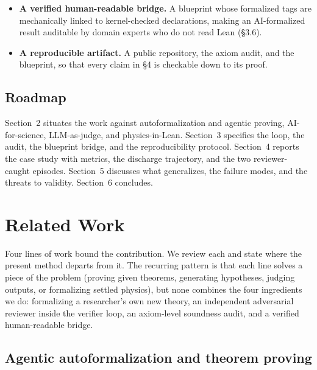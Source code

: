\documentclass[11pt]{article}
\begin{document}
\begin{itemize}
  kernel-checkable episodes in which the independent reviewer caught a false axiom and an
  inconsistent one invisible to the axiom counter, which motivated a vacuity lint as a complementary
  guard (\S4.4).
\item \textbf{A verified human-readable bridge.} A blueprint whose formalized tags are mechanically
  linked to kernel-checked declarations, making an AI-formalized result auditable by domain experts
  who do not read Lean (\S3.6).
\item \textbf{A reproducible artifact.} A public repository, the axiom audit, and the blueprint, so
  that every claim in \S4 is checkable down to its proof.
\end{itemize}

\subsection{Roadmap}

Section~2 situates the work against autoformalization and agentic proving, AI-for-science,
LLM-as-judge, and physics-in-Lean. Section~3 specifies the loop, the audit, the blueprint bridge,
and the reproducibility protocol. Section~4 reports the case study with metrics, the discharge
trajectory, and the two reviewer-caught episodes. Section~5 discusses what generalizes, the failure
modes, and the threats to validity. Section~6 concludes.

\section{Related Work}

Four lines of work bound the contribution. We review each and state where the present method
departs from it. The recurring pattern is that each line solves a piece of the problem (proving
given theorems, generating hypotheses, judging outputs, or formalizing settled physics), but none
combines the four ingredients we do: formalizing a researcher's own new theory, an independent
adversarial reviewer inside the verifier loop, an axiom-level soundness audit, and a verified
human-readable bridge.

\subsection{Agentic autoformalization and theorem proving}
\end{document}
